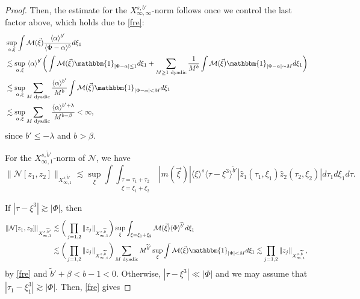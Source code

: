 \documentclass[a4paper,
11pt,  reqno]{amsart}
\newcommand{\jap}[1]{\langle #1 \rangle}
\newcommand{\5}{\textup{V}}
\newcommand{\noi}{\noindent}
\newcommand{\ft}{\widehat}
\newcommand{\les}{\lesssim}
\newcommand{\wt}{\widetilde}
\theoremstyle{remark}
\newcommand{\jb}[1]
{\langle #1 \rangle}
\numberwithin{equation}{section}
\numberwithin{theorem}{section}
\newcommand{\Ncal}{\mathcal{N}}
\begin{document}
\begin{proof}
		\noi
Then, the estimate for the $X^{s, b'}_{\infty, \infty}$-norm follows once we control the last factor above, which holds due to \eqref{fre}:
			\begin{align}
			&
            \sup_{\alpha,\xi} \int \mathcal{M}(\vec\xi)\frac{\jap{\alpha}^{b'}}{\jap{\Phi-\alpha}^b  } d\xi_1
            \\
&
\les
\sup_{\alpha,\xi}
\ \jap{\alpha}^{b'}
\bigg(
\int \mathcal{M}(\vec\xi)\mathbbm{1}_{|\Phi-\alpha|\le 1} d\xi_1
+
\sum_{M\ge 1 \text{ dyadic}} \frac{1}{M^{b}}\int \mathcal{M}(\vec\xi)\mathbbm{1}_{|\Phi-\alpha|\sim M} d\xi_1
\bigg)
\\
&\les
\sup_{\alpha,\xi}\sum_{M \text{ dyadic}} \frac{\jap{\alpha}^{b'}}{M^{b}}\int \mathcal{M}(\vec\xi)\mathbbm{1}_{|\Phi-\alpha|<M} d\xi_1
\\
&
\lesssim \sup_{\alpha,\xi}\sum_{M \text{ dyadic}} \frac{\jap{\alpha}^{b'+\lambda}}{M^{b-\beta}}
<\infty,
			\end{align}
			since $b'\le -\lambda$ and $b>\beta$.


For the $X^{s,\wt{b}'}_{\infty, 1}$-norm of $\Ncal$, we have
\begin{equation}
				\|\Ncal[z_1,z_2]\|_{X^{s,\wt{b}'}_{\infty,1}} \lesssim \sup_\xi
\int  \int_{\substack{\tau=\tau_1+\tau_2 \\ \xi = \xi_1 + \xi_2}}
|m(\vec\xi)|
\jb{\xi}^s
 \jap{\tau-\xi^3}^{\wt{b}'}  | \ft{z}_1 (\tau_1, \xi_1) \ft{z}_2(\tau_2, \xi_2)|  d\tau_1 d\xi_1 d\tau.
			\end{equation}

        \noi
			If $|\tau-\xi^3|\gtrsim |\Phi|$, then
			\begin{align}
				\|\Ncal[z_1,z_2]\|_{X^{s,\wt{b}'}_{\infty,1}}
&
\lesssim
\bigg(
\prod_{j=1, 2}\|z_j\|_{X^{s,\wt{b}}_{\infty,1}}
\bigg)
\sup_\xi \int_{\xi=\xi_1+\xi_2} \mathcal{M}(\vec\xi) \jap{\Phi}^{\wt{b}'} d\xi_1  \\
&
\lesssim
\bigg(
\prod_{j=1, 2}\|z_j\|_{X^{s,\wt{b}}_{\infty,1}}
\bigg)
\sum_{M \text{ dyadic}} M^{\wt{b}'} \sup_\xi \int \mathcal{M} (\vec\xi)
\mathbbm{1}_{|\Phi|<M} d\xi_1
 \lesssim
\prod_{j=1, 2}\|z_j\|_{X^{s,\wt{b}}_{\infty,1}} ,
			\end{align}
			by \eqref{fre} and $\wt{b}'+\beta<b-1<0$.
Otherwise, $|\tau-\xi^3|\ll |\Phi|$ and we may assume that $|\tau_1-\xi_1^3|\gtrsim |\Phi|$. Then, \eqref{fre} gives



\end{proof}
\end{document}
